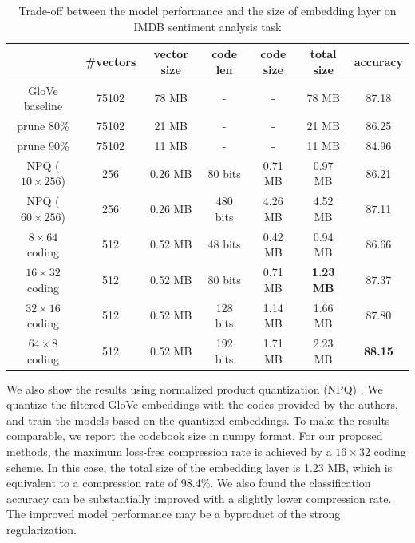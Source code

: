 \documentclass{article} %
\begin{document}
\begin{table}[h]
\begin{center}
    \begin{tabular}{c|c|c|c|c|c|c}
    \hline \hline
    & {\bf \#vectors}  & {\bf \small vector size} & {\bf code len} & {\bf code size} & {\bf total size} & {\bf accuracy} \\
    \hline
    \small{GloVe baseline} & 75102 & 78 MB & - & - & 78 MB & 87.18 \\
    \hline
    \small{prune 80\%} & 75102 & 21 MB & - & - & 21 MB & 86.25 \\
    \small{prune 90\%} & 75102 & 11 MB & - & - & 11 MB & 84.96 \\
    \hline
    NPQ ($10 \times 256$) & 256 & 0.26 MB & 80 bits & 0.71 MB & 0.97 MB & 86.21 \\
    NPQ ($60 \times 256$) & 256 & 0.26 MB & 480 bits & 4.26 MB & 4.52 MB & 87.11 \\
    \hline
    $8 \times 64$ coding & 512 & 0.52 MB & 48 bits & 0.42 MB & {0.94 MB} & {86.66} \\
    $16 \times 32$ coding & 512 & 0.52 MB & 80 bits & 0.71 MB & {\bf 1.23 MB} & {87.37} \\
    $32 \times 16$ coding & 512 & 0.52 MB & 128 bits & 1.14 MB & {1.66 MB} & {87.80} \\
    $64 \times 8$ coding & 512 & 0.52 MB & 192 bits & 1.71 MB & {2.23 MB} & {\bf 88.15} \\
    \hline \hline
    \end{tabular}
    \caption{Trade-off between the model performance and the size of embedding layer on IMDB sentiment analysis task}
    \label{table:imdb_acc}
\end{center}
\end{table}

We also show the results using normalized product quantization (NPQ) \citep{Joulin2016FastTextzipCT}. We quantize the filtered GloVe embeddings with the codes provided by the authors, and train the models based on the quantized embeddings. To make the results comparable, we report the codebook size in numpy format. For our proposed methods, the maximum loss-free compression rate is achieved by a $16 \times 32$ coding scheme. In this case, the total size of the embedding layer is 1.23 MB, which is equivalent to a compression rate of 98.4\%. We also found the classification accuracy can be substantially improved with a slightly lower compression rate. The improved model performance may be a byproduct of the strong regularization.
\end{document}
